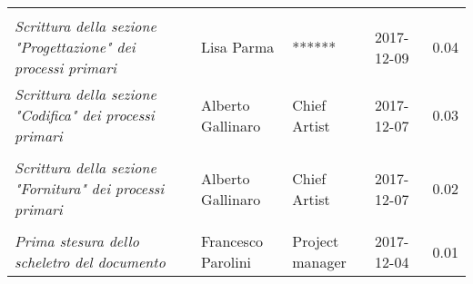 \newpage 
\section*{}
\begin{table}[H]
	\centering
	\begin{tabular}{p{4cm}|C{3cm}|C{3cm}|R{2.5cm}|R{2cm}}
		
		 & & & & \\
		
		
		\emph{Scrittura della sezione "Progettazione" dei processi primari}	 & Lisa Parma & ****** & 2017-12-09 & 0.04 \\
		\hline
		\emph{Scrittura della sezione "Codifica" dei processi primari} & Alberto Gallinaro & Chief Artist & 2017-12-07 & 0.03 \\
		& & & & \\
		
		\hline
		\emph{Scrittura della sezione "Fornitura" dei processi primari} & Alberto Gallinaro & Chief Artist & 2017-12-07 & 0.02 \\
		& & & & \\
		
		\hline
		\emph{Prima stesura dello scheletro del documento} & Francesco Parolini & Project manager & 2017-12-04 & 0.01 \\
		
		
	\end{tabular}
	
\end{table}


\clearpage